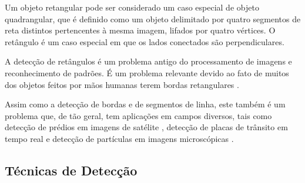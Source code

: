 

Um objeto retangular pode ser considerado um caso especial de objeto quadrangular, que é definido \cite{objquadrangular01} como um objeto delimitado por quatro segmentos de reta distintos pertencentes à mesma imagem, lifados por quatro vértices. O retângulo é um caso especial em que os lados conectados são perpendiculares.

A detecção de retângulos é um problema antigo do processamento de imagens e reconhecimento de padrões. É um problema relevante devido ao fato de muitos dos objetos feitos por mãos humanas terem bordas retangulares \cite{mrf}. 

Assim como a detecção de bordas e de segmentos de linha, este também é um problema que, de tão geral, tem aplicações em campos diversos, tais como detecção de prédios em imagens de satélite \cite{prediosatelite,prediosatelite00}, detecção de placas de trânsito em tempo real \cite{placatransito} e detecção de partículas em imagens microscópicas \cite{detecparticulas}. %

\subsection{Técnicas de Detecção}


